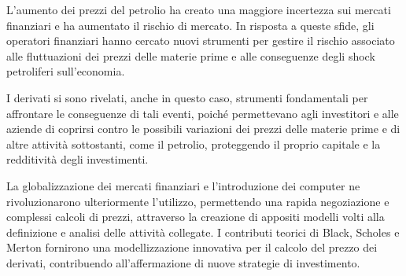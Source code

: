 \documentclass[12pt,a4paper]{report}
\begin{document}
L'aumento dei prezzi del petrolio ha creato una maggiore incertezza sui mercati finanziari e ha aumentato il rischio di mercato. In risposta a queste sfide, gli operatori finanziari hanno cercato nuovi strumenti per gestire il rischio associato alle fluttuazioni dei prezzi delle materie prime e alle conseguenze degli shock petroliferi sull'economia.

I derivati si sono rivelati, anche in questo caso, strumenti fondamentali per affrontare le conseguenze di tali eventi, poiché permettevano agli investitori e alle aziende di coprirsi contro le possibili variazioni dei prezzi delle materie prime e di altre attività sottostanti, come il petrolio, proteggendo il proprio capitale e la redditività degli investimenti.

La globalizzazione dei mercati finanziari e l'introduzione dei computer ne rivoluzionarono ulteriormente l'utilizzo, permettendo una rapida negoziazione e complessi calcoli di prezzi, attraverso la creazione di appositi modelli volti alla definizione e analisi delle attività collegate. I contributi teorici di Black, Scholes e Merton fornirono una modellizzazione innovativa per il calcolo del prezzo dei derivati, contribuendo all'affermazione di nuove strategie di investimento.
\end{document}

